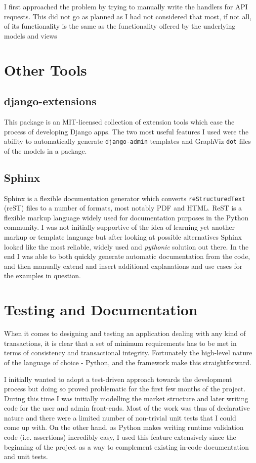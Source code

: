 \documentclass[bsc,frontabs,twoside,singlespacing,parskip,deptreport]{infthesis}     %
\begin{document}
    I first approached the problem by trying to manually write the handlers for API requests. This did not go as planned as I had not considered that most, if not all, of its functionality is the same as the functionality offered by the underlying models and views 

\section{Other Tools}

\subsection{django-extensions}
    This package is an MIT-licensed collection of extension tools which ease the process of developing Django apps. The two most useful features I used were the ability to automatically generate {\tt django-admin} templates and GraphViz {\tt dot} files of the models in a package. 

\subsection{Sphinx}
    Sphinx is a flexible documentation generator which converts {\tt reStructuredText} (reST) files to a number of formats, most notably PDF and HTML. ReST is a flexible markup language widely used for documentation purposes in the Python community. I was not initially supportive of the idea of learning yet another markup or template language but after looking at possible alternatives Sphinx looked like the most reliable, widely used and {\em pythonic} solution out there. In the end I was able to both quickly generate automatic documentation from the code, and then manually extend and insert additional explanations and use cases for the examples in question.

\section{Testing and Documentation}
    When it comes to designing and testing an application dealing with any kind of transactions, it is clear that a set of minimum requirements has to be met in terms of consistency and transactional integrity. Fortunately the high-level nature of the language of choice - Python, and the framework make this straightforward.

I initially wanted to adopt a test-driven approach towards the development process but doing so proved problematic for the first few months of the project. During this time I was initially modelling the market structure and later writing code for the user and admin front-ends. Most of the work was thus of declarative nature and there were a limited number of non-trivial unit tests that I could come up with. On the other hand, as Python makes writing runtime validation code (i.e. assertions) incredibly easy, I used this feature extensively since the beginning of the project as a way to complement existing in-code documentation and unit tests. 
\end{document}

